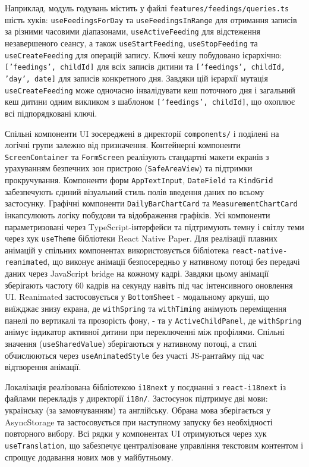 Наприклад, модуль годувань містить у файлі \texttt{features/feedings/queries.ts} шість хуків: \texttt{useFeedingsForDay} та \texttt{useFeedingsInRange} для отримання записів за різними часовими діапазонами, \texttt{useActiveFeeding} для відстеження незавершеного сеансу, а також \texttt{useStartFeeding}, \texttt{useStopFeeding} та \texttt{useCreateFeeding} для операцій запису. Ключі кешу побудовано ієрархічно: \texttt{['feedings', childId]} для всіх записів дитини та \texttt{['feedings', childId, 'day', date]} для записів конкретного дня. Завдяки цій ієрархії мутація \texttt{useCreateFeeding} може одночасно інвалідувати кеш поточного дня і загальний кеш дитини одним викликом з шаблоном \texttt{['feedings', childId]}, що охоплює всі підпорядковані ключі.

Спільні компоненти \gls{UI} зосереджені в директорії \texttt{components/} і поділені на логічні групи залежно від призначення. Контейнерні компоненти \texttt{ScreenContainer} та \texttt{FormScreen} реалізують стандартні макети екранів з урахуванням безпечних зон пристрою (\texttt{SafeAreaView}) та підтримки прокручування. Компоненти форм \texttt{AppTextInput}, \texttt{DateField} та \texttt{KindGrid} забезпечують єдиний візуальний стиль полів введення даних по всьому застосунку. Графічні компоненти \texttt{DailyBarChartCard} та \texttt{MeasurementChartCard} інкапсулюють логіку побудови та відображення графіків. Усі компоненти параметризовані через TypeScript-інтерфейси та підтримують темну і світлу теми через хук \texttt{useTheme} бібліотеки React Native Paper. Для реалізації плавних анімацій у спільних компонентах використовується бібліотека \texttt{react-native-reanimated}, що виконує анімації безпосередньо у нативному потоці без передачі даних через JavaScript bridge на кожному кадрі. Завдяки цьому анімації зберігають частоту 60 кадрів на секунду навіть під час інтенсивного оновлення \gls{UI}. Reanimated застосовується у \texttt{BottomSheet} - модальному аркуші, що виїжджає знизу екрана, де \texttt{withSpring} та \texttt{withTiming} анімують переміщення панелі по вертикалі та прозорість фону, - та у \texttt{ActiveChildPanel}, де \texttt{withSpring} анімує індикатор активної дитини при переключенні між профілями. Спільні значення (\texttt{useSharedValue}) зберігаються у нативному потоці, а стилі обчислюються через \texttt{useAnimatedStyle} без участі JS-рантайму під час відтворення анімації.

Локалізація реалізована бібліотекою \texttt{i18next} у поєднанні з \texttt{react-i18next} із файлами перекладів у директорії \texttt{i18n/}. Застосунок підтримує дві мови: українську (за замовчуванням) та англійську. Обрана мова зберігається у AsyncStorage та застосовується при наступному запуску без необхідності повторного вибору. Всі рядки у компонентах \gls{UI} отримуються через хук \texttt{useTranslation}, що забезпечує централізоване управління текстовим контентом і спрощує додавання нових мов у майбутньому.

